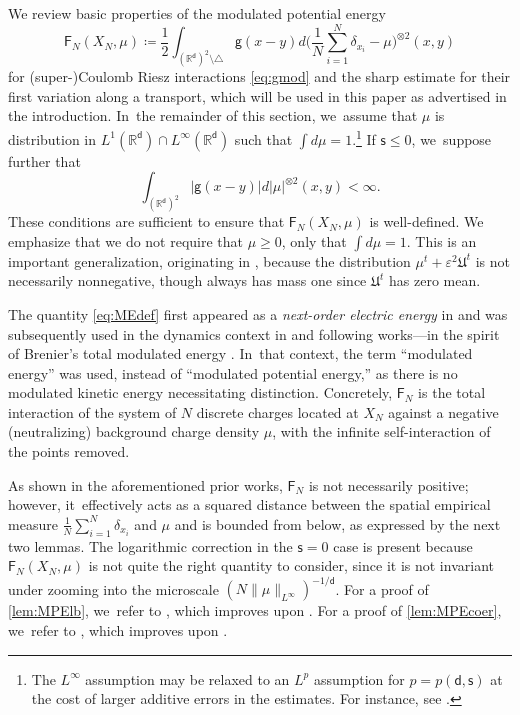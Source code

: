 \documentclass[JEP,XML,SOM,Unicode,published]{cedram}
\theoremstyle{plain}
\theoremstyle{definition}
\newcommand{\R}{{\mathbb{R}}}
\let\vep\varepsilon
\let\ux X
\newcommand{\XN}{X_N}
\newcommand{\Uu}{\mathfrak{U}}
\newcommand{\Fr}{\mathsf{F}}
\renewcommand{\d}{\mathsf{d}}
\newcommand{\g}{{\mathsf{g}}}
\newcommand{\s}{\mathsf{s}}
\begin{document}
We review basic properties of the modulated potential energy
\begin{equation}\label{eq:MEdef}
\Fr_N(\ux_N,\mu) \coloneqq \frac12\int_{(\R^\d)^2 \setminus\triangle}\g(x-y)d\Big(\frac1N\sum_{i=1}^N\delta_{x_i}-\mu\Big)^{\otimes2}(x,y)
\end{equation}
for (super-)Coulomb Riesz interactions \eqref{eq:gmod} and the sharp estimate for their first variation along a transport, which will be used in this paper as advertised in the introduction. In~the remainder of this section, we~assume that $\mu$ is distribution in $L^1(\R^\d) \cap L^\infty(\R^\d)$ such that $\int d\mu = 1$.\footnote{The $L^\infty$ assumption may be relaxed to an $L^p$ assumption for $p=p(\d,\s)$ at the cost of larger additive errors in the estimates. For instance, see \cite[\S 3]{Rosenzweig2022, Rosenzweig2022a}.} If $\s\le 0$, we~suppose further that
\[
\int_{(\R^\d)^2}|\g(x-y)|d|\mu|^{\otimes 2}(x,y)<\infty.
\]
These conditions are sufficient to ensure that $\Fr_N(\XN,\mu)$ is well-defined.
We emphasize that we do not require that $\mu\ge 0$, only that $\int d\mu =1$. This is an important {generalization}, originating in \cite{Rosenzweig2021ne}, because the distribution $\mu^t+\vep^2\Uu^t$ is not necessarily nonnegative, though always has mass one since $\Uu^t$ has zero mean.

The quantity \eqref{eq:MEdef} first appeared as a \emph{next-order electric energy} in \cite{SS2015,RS2016,PS2017} and was subsequently used in the dynamics context in \cite{Duerinckx2016,Serfaty2020} and following works---in the spirit of Brenier's total modulated energy \cite{Brenier2000}. In~that context, the term ``modulated energy'' was used, instead of ``modulated potential energy,'' as there is no modulated kinetic energy necessitating distinction. Concretely, {$\Fr_N$} is the total interaction of the system of $N$ discrete charges located at $\XN$ against a negative (neutralizing) background charge density $\mu$, with the infinite self-interaction of the points removed.

As shown in the aforementioned prior works, $\Fr_N$ is not necessarily positive; however, it~effectively acts as a squared distance between the spatial empirical measure $\frac1N\sum_{i=1}^N \delta_{x_i}$ and $\mu$ and is bounded from below, as expressed by the next two lemmas. The logarithmic correction in the $\s=0$ case is present because $\Fr_N(\ux_N,\mu)$ is not quite the right quantity to consider, since it is not invariant under zooming into the microscale $(N\|\mu\|_{L^\infty})^{-1/\d}$. For a proof of \cref{lem:MPElb}, we~refer to \cite[Prop.\,2.3]{RS2022}, which improves upon \cite[Cor.\,3.4]{Serfaty2020}. For a proof of \cref{lem:MPEcoer}, we~refer to \cite[Lem.\,3.1, Cor.\,3.3]{SerfatyLN}, which improves upon \cite[Prop.\,3.6]{Serfaty2020}.
\end{document}
